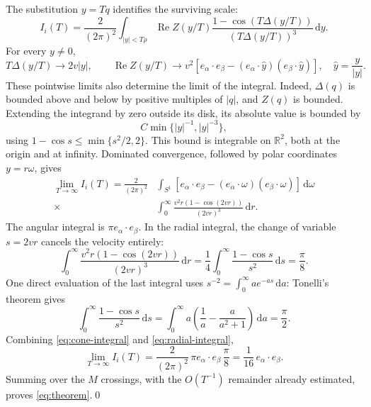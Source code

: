 \documentclass[11pt,a4paper]{article}
\newcommand{\R}{\mathbb R}
\newcommand{\dd}{\,\mathrm d}
\DeclareMathOperator{\Rea}{Re}
\theoremstyle{remark}
\numberwithin{equation}{section}
\begin{document}
The substitution $y=Tq$ identifies the surviving scale:
\begin{equation}
 I_i(T)=\frac{2}{(2\pi)^2}
 \int_{|y|<T\rho}\Rea Z(y/T)
       \frac{1-\cos(T\Delta(y/T))}{(T\Delta(y/T))^3}\dd y.
 \label{eq:rescaling}
\end{equation}
For every $y\ne0$,
\[
 T\Delta(y/T)\longrightarrow2v|y|,
 \qquad
 \Rea Z(y/T)\longrightarrow
 v^2\left[e_\alpha\cdot e_\beta
       -(e_\alpha\cdot\widehat y)(e_\beta\cdot\widehat y)\right],
 \quad \widehat y=\frac y{|y|}.
\]
These pointwise limits also determine the limit of the integral.
Indeed, $\Delta(q)$ is bounded above and below by positive multiples
of $|q|$, and $Z(q)$ is bounded. Extending the integrand by zero
outside its disk, its absolute value is bounded by
\begin{equation}
 C\min\{|y|^{-1},|y|^{-3}\},
 \label{eq:domination}
\end{equation}
using $1-\cos s\leq\min\{s^2/2,2\}$. This bound is integrable on
$\R^2$, both at the origin and at infinity. Dominated convergence,
followed by polar coordinates $y=r\omega$, gives
\begin{equation}
 \begin{split}
 \lim_{T\to\infty}I_i(T)
 =\frac{2}{(2\pi)^2}
 &\int_{S^1}\left[e_\alpha\cdot e_\beta
       -(e_\alpha\cdot\omega)(e_\beta\cdot\omega)\right]\dd\omega\\
 {}\times&\int_0^\infty
       \frac{v^2r(1-\cos(2vr))}{(2vr)^3}\dd r.
 \end{split}
 \label{eq:cone-integral}
\end{equation}
The angular integral is $\pi e_\alpha\cdot e_\beta$. In the radial
integral, the change of variable $s=2vr$ cancels the velocity entirely:
\begin{equation}
 \int_0^\infty\frac{v^2r(1-\cos(2vr))}{(2vr)^3}\dd r
 =\frac14\int_0^\infty\frac{1-\cos s}{s^2}\dd s
 =\frac\pi8.
 \label{eq:radial-integral}
\end{equation}
One direct evaluation of the last integral uses
$s^{-2}=\int_0^\infty a e^{-as}\dd a$: Tonelli's theorem gives
\[
 \int_0^\infty\frac{1-\cos s}{s^2}\dd s
 =\int_0^\infty a\left(\frac1a-\frac a{a^2+1}\right)\dd a
 =\frac\pi2.
\]
Combining \eqref{eq:cone-integral} and \eqref{eq:radial-integral},
\[
 \lim_{T\to\infty}I_i(T)
 =\frac{2}{(2\pi)^2}\,\pi e_\alpha\cdot e_\beta\,\frac\pi8
 =\frac1{16}\,e_\alpha\cdot e_\beta.
\]
Summing over the $M$ crossings, with the $O(T^{-1})$ remainder already
estimated, proves \eqref{eq:theorem}.\qed
\end{document}
